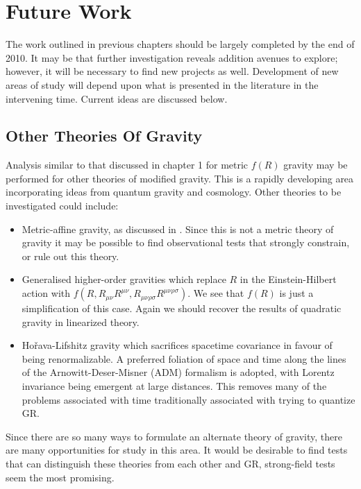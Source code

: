 \chapter{Future Work}

The work outlined in previous chapters should be largely completed by the end of 2010. It may be that further investigation reveals addition avenues to explore; however, it will be necessary to find new projects as well. Development of new areas of study will depend upon what is presented in the literature in the intervening time. Current ideas are discussed below.

\section{Other Theories Of Gravity}

Analysis similar to that discussed in chapter 1 for metric $f(R)$ gravity may be performed for other theories of modified gravity. This is a rapidly developing area incorporating ideas from quantum gravity and cosmology. Other theories to be investigated could include:
\begin{itemize}
\item Metric-affine gravity\cite{Sotiriou2007, Sotiriou2007b}, as discussed in . Since this is not a metric theory of gravity it may be possible to find observational tests that strongly constrain, or rule out this theory\cite{Will2006}.
\item{} Generalised higher-order gravities which replace $R$ in the Einstein-Hilbert action with $f(R, R_{\mu\nu}R^{\mu\nu}, R_{\mu\nu\rho\sigma}R^{\mu\nu\rho\sigma})$\cite{Farhoudi2006, Madsen1989}. We see that $f(R)$ is just a simplification of this case. Again we should recover the results of quadratic gravity in linearized theory\cite{Pechlaner1966, Stelle1978, Schmidt1986, Teyssandier1990, Capozziello2009b}.
\item{} Ho\v{r}ava-Lifshitz gravity\cite{Horava2009, Blas2010a, Sotiriou2009c} which sacrifices spacetime covariance in favour of being renormalizable. A preferred foliation of space and time along the lines of the Arnowitt-Deser-Misner (ADM) formalism is adopted\cite{Arnowitt1962a}, with Lorentz invariance being emergent at large distances. This removes many of the problems associated with time traditionally associated with trying to quantize GR.
\end{itemize}
Since there are so many ways to formulate an alternate theory of gravity, there are many opportunities for study in this area. It would be desirable to find tests that can distinguish these theories from each other and GR, strong-field tests seem the most promising.

